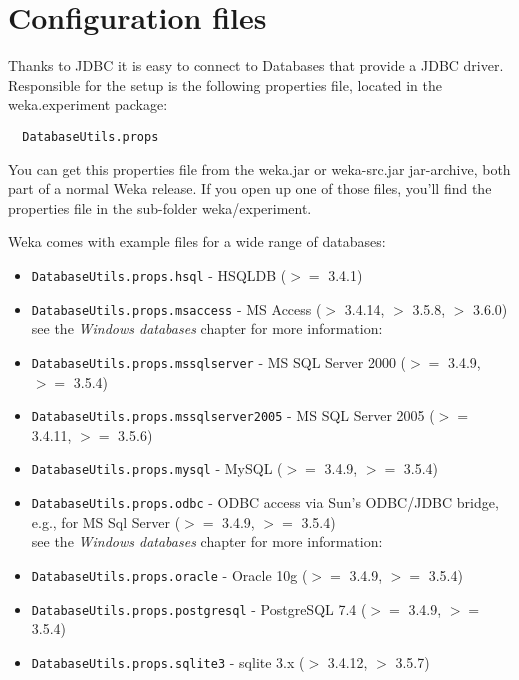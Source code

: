 %
%
%
%


\label{databases}

\section{Configuration files}
Thanks to JDBC it is easy to connect to Databases that provide a JDBC driver. Responsible for the setup is the following properties file, located in the weka.experiment package:

\begin{verbatim}
  DatabaseUtils.props
\end{verbatim}

\noindent You can get this properties file from the weka.jar or weka-src.jar jar-archive, both part of a normal Weka release. If you open up one of those files, you'll find the properties file in the sub-folder weka/experiment.

Weka comes with example files for a wide range of databases:

\begin{itemize}
	\item \texttt{DatabaseUtils.props.hsql} - HSQLDB ($>=$ 3.4.1)
	\item \texttt{DatabaseUtils.props.msaccess} - MS Access ($>$ 3.4.14, $>$ 3.5.8, $>$ 3.6.0) \\
	see the \textit{Windows databases} chapter for more information:
	\item \texttt{DatabaseUtils.props.mssqlserver} - MS SQL Server 2000 ($>=$ 3.4.9, $>=$ 3.5.4)
	\item \texttt{DatabaseUtils.props.mssqlserver2005} - MS SQL Server 2005 ($>=$ 3.4.11, $>=$ 3.5.6)
	\item \texttt{DatabaseUtils.props.mysql} - MySQL ($>=$ 3.4.9, $>=$ 3.5.4)
	\item \texttt{DatabaseUtils.props.odbc} - ODBC access via Sun's ODBC/JDBC bridge, e.g., for MS Sql Server ($>=$ 3.4.9, $>=$ 3.5.4) \\
	see the \textit{Windows databases} chapter for more information:
	\item \texttt{DatabaseUtils.props.oracle} - Oracle 10g ($>=$ 3.4.9, $>=$ 3.5.4)
	\item \texttt{DatabaseUtils.props.postgresql} - PostgreSQL 7.4 ($>=$ 3.4.9, $>=$ 3.5.4)
	\item \texttt{DatabaseUtils.props.sqlite3} - sqlite 3.x ($>$ 3.4.12, $>$ 3.5.7)
\end{itemize}

